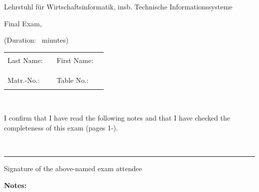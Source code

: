 \thispagestyle{empty}

\hfill
\begin{minipage}[b]{0.7\textwidth}
\end{minipage}
\begin{flushright}
	Lehrstuhl f{\"u}r Wirtschaftsinformatik, insb. Technische Informationssysteme
\end{flushright}
\begin{flushright}
	\vspace{0.5cm}\examDate
\end{flushright}

\enlargethispage{3em}

{\Large
	\begin{center}
		Final Exam, \examSemester
	
		\textbf{\examName} 
	
		(Duration: \examMinutes \ minutes)
	\end{center}
}

{\large
	\vspace{1cm}
	\begin{tabular}{llll}
		Last Name: & \rule{4cm}{1pt} & First Name: & \rule{4.5cm}{1pt}  \\
		&&& \\
		Matr.-No.: & \rule{4cm}{1pt} & Table No.: & \rule{4.5cm}{1pt} \\
	\end{tabular}
}

~\vspace{0.0cm}

I confirm that I have read the following notes and that I have checked the com\-plete\-ness
of this exam (pages 1-\pageref{LastPage}).

~\vspace{0.5cm}

\begin{flushright}
	\begin{minipage}{8cm}
		\rule{\textwidth}{0.5pt}
		Signature of the above-named exam attendee
	\end{minipage}
\end{flushright}

\textbf{Notes:}

